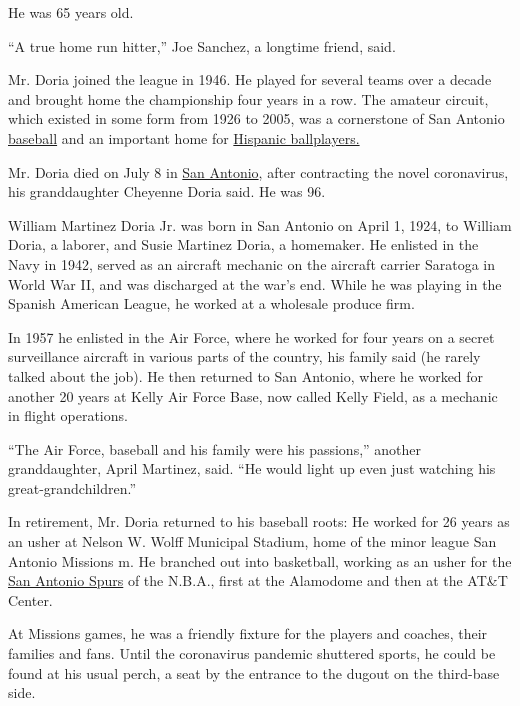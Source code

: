 He was 65 years old.

``A true home run hitter,'' Joe Sanchez, a longtime friend, said.

Mr. Doria joined the league in 1946. He played for several teams over a
decade and brought home the championship four years in a row. The
amateur circuit, which existed in some form from 1926 to 2005, was a
cornerstone of San Antonio
\href{https://www.nytimes3xbfgragh.onion/2020/07/20/sports/baseball/minor-leagues-coronavirus-fargo.html}{baseball}
and an important home for
\href{https://www.nytimes3xbfgragh.onion/2016/08/07/sports/baseball/eduardo-nunez-putting-accent-on-spanish-names.html}{Hispanic
ballplayers.}

Mr. Doria died on July 8 in
\href{https://www.nytimes3xbfgragh.onion/interactive/2020/us/texas-coronavirus-cases.html}{San
Antonio}, after contracting the novel coronavirus, his granddaughter
Cheyenne Doria said. He was 96.

William Martinez Doria Jr. was born in San Antonio on April 1, 1924, to
William Doria, a laborer, and Susie Martinez Doria, a homemaker. He
enlisted in the Navy in 1942, served as an aircraft mechanic on the
aircraft carrier Saratoga in World War II, and was discharged at the
war's end. While he was playing in the Spanish American League, he
worked at a wholesale produce firm.

In 1957 he enlisted in the Air Force, where he worked for four years on
a secret surveillance aircraft in various parts of the country, his
family said (he rarely talked about the job). He then returned to San
Antonio, where he worked for another 20 years at Kelly Air Force Base,
now called Kelly Field, as a mechanic in flight operations.

``The Air Force, baseball and his family were his passions,'' another
granddaughter, April Martinez, said. ``He would light up even just
watching his great-grandchildren.''

In retirement, Mr. Doria returned to his baseball roots: He worked for
26 years as an usher at Nelson W. Wolff Municipal Stadium, home of the
minor league San Antonio Missions m. He branched out into basketball,
working as an usher for the
\href{https://www.nytimes3xbfgragh.onion/2020/07/22/sports/basketball/nba-bubble-practice.html}{San
Antonio Spurs} of the N.B.A., first at the Alamodome and then at the
AT\&T Center.

At Missions games, he was a friendly fixture for the players and
coaches, their families and fans. Until the coronavirus pandemic
shuttered sports, he could be found at his usual perch, a seat by the
entrance to the dugout on the third-base side.

